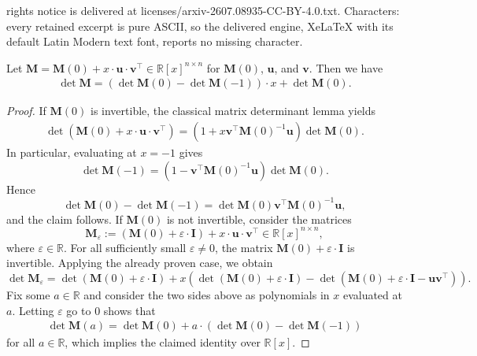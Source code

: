 \documentclass[10pt,a4paper]{amsart}
\newcommand{\R}{\mathbb{R}}
\newcommand{\bM}{\bm{M}}
\newcommand{\bu}{\bm{u}}
\newcommand{\bv}{\bm{v}}
\newcommand{\id}{\bm{I}}
\newcommand{\indet}{x}
\newcommand{\polyM}{\bM}
\begin{document}
rights notice is delivered at licenses/arxiv-2607.08935-CC-BY-4.0.txt. Characters: every retained excerpt is pure ASCII, so the delivered engine, XeLaTeX with its default Latin Modern text font, reports no missing character.
	\begin{lemma}
		\label{lemma_matrix_determinant_lemma}
		Let $\polyM = \bM(0)+ \indet \cdot\bu\cdot\bv^\top\in\R[\indet]^{n\times n}$ for $\bM(0)$, $\bu$, and $\bv$. Then we have
		\begin{align*}
			\det \polyM = (\det\bM(0) - \det\bM(-1))\cdot \indet + \det\bM(0).
		\end{align*}
	\end{lemma}

	\begin{proof}
		If $\bM(0)$ is invertible, the classical matrix determinant lemma yields 
		\begin{align*}
			\det\left(\bM(0)+\indet\cdot\bu\cdot\bv^\top\right) = \left(1+\indet\bv^\top \bM(0)^{-1}\bu\right)\det\bM(0).
		\end{align*}
		In particular, evaluating at $\indet = -1$ gives
		\[
		\det\bM(-1)=\left(1-\bv^\top \bM(0)^{-1}\bu\right)\det\bM(0).
		\]
		Hence
		\[
		\det\bM(0)-\det\bM(-1)
		=\det\bM(0)\bv^\top \bM(0)^{-1}\bu,
		\]
		and the claim follows. If $\bM(0)$ is not invertible, consider the matrices
		\[
		\bM_\varepsilon := \left(\bM(0) + \varepsilon\cdot \id\right) + \indet \cdot\bu\cdot\bv^\top\in\R[\indet]^{n\times n},
		\]
		where $\varepsilon\in\mathbb{R}$.
		For all sufficiently small $\varepsilon\neq 0$, the matrix $\bM(0) + \varepsilon\cdot \id$ is invertible. Applying the already proven case, we obtain
		\[
		\det\bM_\varepsilon
		=
		\det(\bM(0) + \varepsilon\cdot \id)
		+ \indet\left(\det(\bM(0) + \varepsilon\cdot \id)-\det(\bM(0) + \varepsilon \cdot\id-\bu\bv^\top)\right).
		\]
		Fix some $a\in\R$ and consider the two sides above as polynomials in $\indet$ evaluated at $a$. Letting $\varepsilon$ go to $0$ shows that 
		\begin{align*}
			\det\bM(a) = \det\bM(0) + a\cdot\left(\det\bM(0) - \det\bM(-1)\right)
		\end{align*}
		for all $a\in \R$, which implies the claimed identity over $\R[x]$.
	\end{proof}
\end{document}
